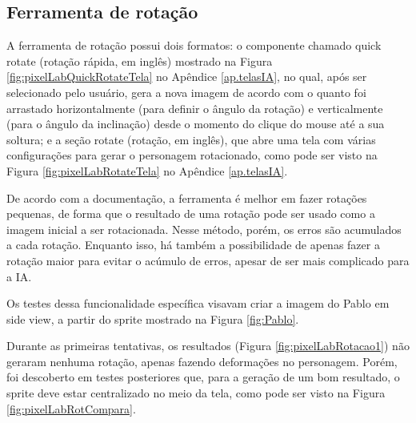 \FloatBarrier
\subsection{Ferramenta de rotação}
\label{s.pixelLab.rotacao}

A ferramenta de rotação possui dois formatos: o componente chamado quick rotate (rotação rápida, em inglês) mostrado na Figura \ref{fig:pixelLabQuickRotateTela} no Apêndice \ref{ap.telasIA}, no qual, após ser selecionado pelo usuário, gera a nova imagem de acordo com o quanto foi arrastado horizontalmente (para definir o ângulo da rotação) e verticalmente (para o ângulo da inclinação) desde o momento do clique do mouse até a sua soltura; e a seção rotate (rotação, em inglês), que abre uma tela com várias configurações para gerar o personagem rotacionado, como pode ser visto na Figura \ref{fig:pixelLabRotateTela} no Apêndice \ref{ap.telasIA}. 

De acordo com a documentação, a ferramenta é melhor em fazer rotações pequenas, de forma que o resultado de uma rotação pode ser usado como a imagem inicial a ser rotacionada. Nesse método, porém, os erros são acumulados a cada rotação. Enquanto isso, há também a possibilidade de apenas fazer a rotação maior para evitar o acúmulo de erros, apesar de ser mais complicado para a IA.

Os testes dessa funcionalidade específica visavam criar a imagem do Pablo em side view, a partir do sprite mostrado na Figura \ref{fig:Pablo}.

Durante as primeiras tentativas, os resultados (Figura \ref{fig:pixelLabRotacao1}) não geraram nenhuma rotação, apenas fazendo deformações no personagem. Porém, foi descoberto em testes posteriores que, para a geração de um bom resultado, o sprite deve estar centralizado no meio da tela, como pode ser visto na Figura \ref{fig:pixelLabRotCompara}.


